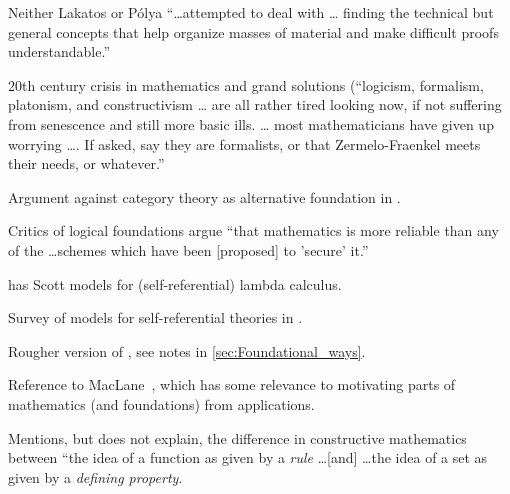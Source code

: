 Neither Lakatos or P\'{o}lya ``\ldots attempted to deal with 
\ldots
finding the technical but general concepts that 
help organize masses of material and make difficult 
proofs understandable.''

\label{sec:Foundational_ways}

\cite[ch~4 ``Foundational ways'']{Feferman1998LightOfLogic}

$20$th century crisis in mathematics and grand solutions 
(``logicism, formalism, platonism, and constructivism \ldots
are all rather tired looking now, if not suffering from
senescence and still more basic ills. \ldots
most mathematicians have given up worrying \dots .
If asked, say they are formalists, or that
Zermelo-Fraenkel meets their needs, or whatever.''

Argument against category theory as alternative 
foundation in \cite{feferman_1977_categorical}.

Critics of logical foundations argue ``that mathematics
is more reliable than any of the \ldots schemes which have been
[proposed] to 'secure' it.''

\cite[ch~4, p~99]{Feferman1998LightOfLogic} has
Scott models for (self-referential) lambda 
calculus.~\cite{scottContinuousLattices1972,
scottDataTypesLattices1976}

Survey of models for self-referential theories in 
\cite{fefermanTypeFreeTheoriesI1984}.

\label{sec:Working_foundations_1991}

\cite[ch~5 ``Working foundations 1991'']{Feferman1998LightOfLogic}

Rougher version of \cite[ch~4]{Feferman1998LightOfLogic},
see notes in \autoref{sec:Foundational_ways}.

Reference to MacLane~\cite{maclane1981mathModels},
which has some relevance to motivating
parts of mathematics (and foundations)
from applications.


Mentions, but does not explain, the difference 
in constructive mathematics between
``the idea of a function as given by a \textit{rule}
\ldots [and] \ldots the idea of a set as given by a 
\textit{defining property}.~\cite{feferman1979FunctionsClasses}

